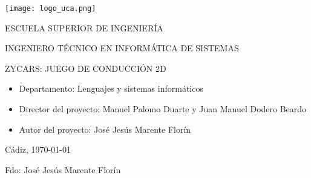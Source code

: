 

\begin{center}

  \texttt{[image: logo\_uca.png]} \\

  \vspace{2.0cm}

  \Large{ESCUELA SUPERIOR DE INGENIERÍA} \\

  \vspace{1.0cm}

  \large{INGENIERO TÉCNICO EN INFORMÁTICA DE SISTEMAS} \\

  \vspace{2.0cm}

  \large{ZYCARS: JUEGO DE CONDUCCIÓN 2D} \\

  \vspace{1.0cm}

\end{center}

\begin{itemize}
\item \large{Departamento: Lenguajes y sistemas informáticos}
\item \large{Director del proyecto: Manuel Palomo Duarte y Juan Manuel Dodero Beardo}
\item \large{Autor del proyecto: José Jesús Marente Florín}
\end{itemize}

\vspace{1.0cm}

\begin{flushright}
  \large{Cádiz, \today} \\

  \vspace{2.5cm}

  \large{Fdo: José Jesús Marente Florín}
\end{flushright}
